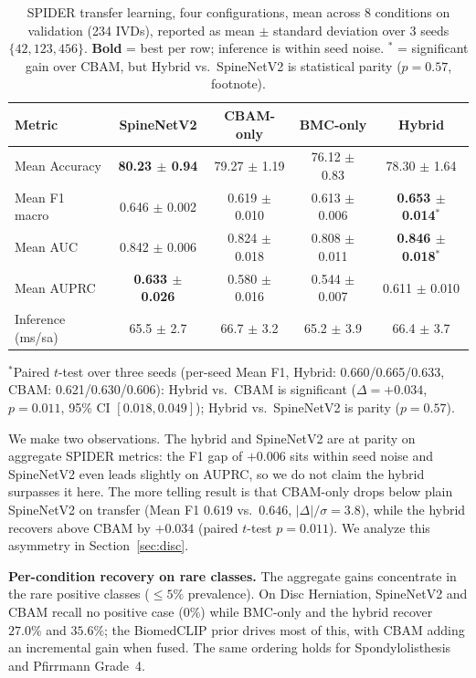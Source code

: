 \documentclass[runningheads]{llncs}
\newcommand{\best}[1]{\textcolor{best}{\textbf{#1}}}
\begin{document}
\begin{table}[t]
\centering
\caption{SPIDER transfer learning, four configurations, mean across 8 conditions on validation (234 IVDs), reported as mean $\pm$ standard deviation over 3 seeds $\{42, 123, 456\}$. \textbf{Bold} = best per row; inference is within seed noise. $^\ast$ = significant gain over CBAM, but Hybrid vs.\ SpineNetV2 is statistical parity ($p=0.57$, footnote).}
\label{tab:spider_transfer_agg}
\footnotesize
\begin{tabular}{@{}lcccc@{}}
\toprule
Metric & SpineNetV2 & CBAM-only & BMC-only & Hybrid \\
\midrule
Mean Accuracy & \best{80.23 $\pm$ 0.94} & 79.27 $\pm$ 1.19 & 76.12 $\pm$ 0.83 & 78.30 $\pm$ 1.64 \\
Mean F1 macro & 0.646 $\pm$ 0.002 & 0.619 $\pm$ 0.010 & 0.613 $\pm$ 0.006 & \best{0.653 $\pm$ 0.014}$^\ast$ \\
Mean AUC      & 0.842 $\pm$ 0.006 & 0.824 $\pm$ 0.018 & 0.808 $\pm$ 0.011 & \best{0.846 $\pm$ 0.018}$^\ast$ \\
Mean AUPRC    & \best{0.633 $\pm$ 0.026} & 0.580 $\pm$ 0.016 & 0.544 $\pm$ 0.007 & 0.611 $\pm$ 0.010 \\
\midrule
Inference (ms/sa) & 65.5 $\pm$ 2.7 & 66.7 $\pm$ 3.2 & 65.2 $\pm$ 3.9 & 66.4 $\pm$ 3.7 \\
\bottomrule
\end{tabular}

\vspace{2pt}
{\raggedright\scriptsize
$^\ast$Paired $t$-test over three seeds (per-seed Mean F1, Hybrid: 0.660/0.665/0.633, CBAM: 0.621/0.630/0.606): Hybrid vs.\ CBAM is significant ($\Delta=+0.034$, $p=0.011$, 95\% CI $[0.018,0.049]$); Hybrid vs.\ SpineNetV2 is parity ($p=0.57$).\par}
\end{table}

We make two observations. The hybrid and SpineNetV2 are at parity on aggregate SPIDER metrics: the F1 gap of $+0.006$ sits within seed noise and SpineNetV2 even leads slightly on AUPRC, so we do not claim the hybrid surpasses it here. The more telling result is that CBAM-only drops below plain SpineNetV2 on transfer (Mean F1 $0.619$ vs.\ $0.646$, $|\Delta|/\sigma = 3.8$), while the hybrid recovers above CBAM by $+0.034$ (paired $t$-test $p=0.011$). We analyze this asymmetry in Section~\ref{sec:disc}.

\textbf{Per-condition recovery on rare classes.}
The aggregate gains concentrate in the rare positive classes ($\leq 5\%$ prevalence). On Disc Herniation, SpineNetV2 and CBAM recall no positive case ($0\%$) while BMC-only and the hybrid recover $27.0\%$ and $35.6\%$; the BiomedCLIP prior drives most of this, with CBAM adding an incremental gain when fused. The same ordering holds for Spondylolisthesis and Pfirrmann Grade~4.
\end{document}

